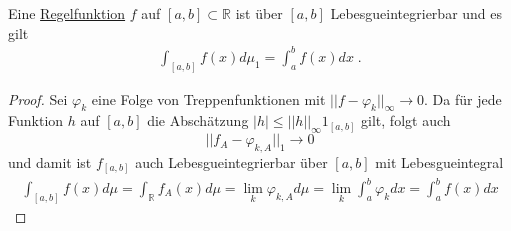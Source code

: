 \begin{Satz}
Eine \href{https://de.wikipedia.org/wiki/Regelfunktion}{Regelfunktion} $f$ auf $[a,b] \subset \mathbb{R}$ ist über $[a,b] $ Lebesgueintegrierbar und es gilt 
\begin{align*}
\int_{[a,b]} f(x) d \mu_1 = \int_a^b f(x) dx \; .
\end{align*}
\end{Satz}
\begin{proof}
Sei $\varphi_k$ eine Folge von Treppenfunktionen mit $|| f -\varphi_k ||_{\infty} \to 0$. Da für jede Funktion $h$ auf $[a,b]$ die Abschätzung
$|h| \leq || h ||_{\infty} 1_{[a,b]}$ gilt, folgt auch $$|| f_A -\varphi_{k,A} ||_{1} \to 0$$ und damit ist $f_{[a,b]}$ auch Lebesgueintegrierbar über $[a,b]$ mit Lebesgueintegral
\begin{align*}
\int_{[a,b]} f(x) d \mu= \int_{\mathbb{R}} f_A(x) d\mu = \lim_k \varphi_{k,A} d \mu = \lim_k \int_a^b \varphi_k dx = \int_a^b f (x) dx
\end{align*}
 
\end{proof}

